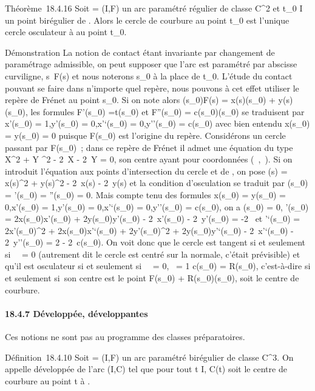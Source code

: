 \documentclass[]{article}
\begin{document}
Théorème~18.4.16 Soit \Gamma = (I,F) un arc paramétré régulier de classe
C^2 et t\_0 \in I un point birégulier de \Gamma. Alors le
cercle de courbure au point t\_0 est l'unique cercle osculateur
à \Gamma au point t\_0.

Démonstration La notion de contact étant invariante par changement de
paramétrage admissible, on peut supposer que l'arc est paramétré par
abscisse curviligne, s\mapsto~F(s) et nous noterons
s\_0 à la place de t\_0. L'étude du contact pouvant se
faire dans n'importe quel repère, nous pouvons à cet effet utiliser le
repère de Frénet au point s\_0. Si on note alors
\overrightarrowF(s\_0)F(s) =
x(s)\vect(s\_0) +
y(s)\vecn(s\_0), les formules
F'(s\_0) =\vec t(s\_0) et
F''(s\_0) =
c(s\_0)\vecn(s\_0) se traduisent par
x'(s\_0) = 1,y'(s\_0) = 0,x'`(s\_0) =
0,y''(s\_0) = c(s\_0) avec bien entendu x(s\_0)
= y(s\_0) = 0 puisque F(s\_0) est l'origine du repère.
Considérons un cercle passant par F(s\_0)~; dans ce repère de
Frénet il admet une équation du type X^2 + Y ^2 -
2\alpha~X - 2\beta~Y = 0, son centre ayant pour coordonnées (\alpha~,\beta~). Si on introduit
l'équation aux points d'intersection du cercle et de \Gamma, on pose \phi(s) =
x(s)^2 + y(s)^2 - 2\alpha~x(s) - 2\beta~y(s) et la condition
d'osculation se traduit par \phi(s\_0) = \phi'(s\_0) =
\phi''(s\_0) = 0. Mais compte tenu des formules x(s\_0) =
y(s\_0) = 0,x'(s\_0) = 1,y'(s\_0) =
0,x'`(s\_0) = 0,y''(s\_0) = c(s\_0), on a
\phi(s\_0) = 0, \phi'(s\_0) = 2x(s\_0)x'(s\_0)
+ 2y(s\_0)y'(s\_0) - 2\alpha~x'(s\_0) -
2\beta~y'(s\_0) = -2\alpha~ et \phi'`(s\_0) =
2x'(s\_0)^2 + 2x(s\_0)x'`(s\_0) +
2y'(s\_0)^2 + 2y(s\_0)y'`(s\_0) -
2\alpha~x'`(s\_0) - 2\beta~y''(s\_0) = 2 - 2\beta~c(s\_0). On
voit donc que le cercle est tangent si et seulement si~\alpha~ = 0 (autrement
dit le cercle est centré sur la normale, c'était prévisible) et qu'il
est osculateur si et seulement si~\alpha~ = 0,\beta~ = 1 \over
c(s\_0) = R(s\_0), c'est-à-dire si et seulement si~son
centre est le point F(s\_0) +
R(s\_0)\vecn(s\_0), soit le centre de
courbure.

\paragraph{18.4.7 Développée, développantes}

Ces notions ne sont pas au programme des classes préparatoires.

Définition~18.4.10 Soit \Gamma = (I,F) un arc paramétré birégulier de classe
C^3. On appelle développée de \Gamma l'arc (I,C) tel que pour tout
t \in I, C(t) soit le centre de courbure au point t à \Gamma.
\end{document}
